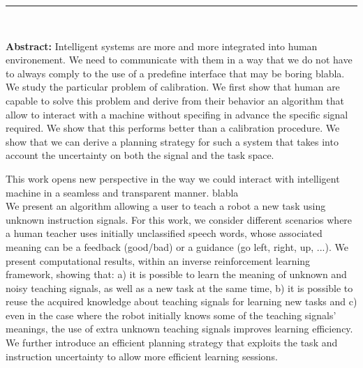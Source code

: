 
\begin{vcenterpage}
\noindent\rule[2pt]{\textwidth}{0.5pt}
\begin{center}
{\large\textbf{\thesistitle\\}}
\end{center}
{\large\textbf{Abstract:}} Intelligent systems are more and more integrated into human environement. We need to communicate with them in a way that we do not have to always comply to the use of a predefine interface that may be boring blabla. We study the particular problem of calibration. We first show that human are capable to solve this problem and derive from their behavior an algorithm that allow to interact with a machine without specifing in advance the specific signal required. We show that this performs better than a calibration procedure. We show that we can derive a planning strategy for such a system that takes into account the uncertainty on both the signal and the task space.

This work opens new perspective in the way we could interact with intelligent machine in a seamless and transparent manner. blabla\\

We present an algorithm allowing a user to teach a robot a new task using unknown instruction signals. For this work, we consider different scenarios where a human teacher uses initially unclassified speech words, whose associated meaning can be a feedback (good/bad) or a guidance (go left, right, up, ...). We present computational results, within an inverse reinforcement learning framework, showing that: a) it is possible to learn the meaning of unknown and noisy teaching signals, as well as a new task at the same time, b) it is possible to reuse the acquired knowledge about teaching signals for learning new tasks and c) even in the case where the robot initially knows some of the teaching signals' meanings, the use of extra unknown teaching signals improves learning efficiency. We further introduce an efficient planning strategy that exploits the task and instruction uncertainty to allow more efficient learning sessions.


\end{vcenterpage}
